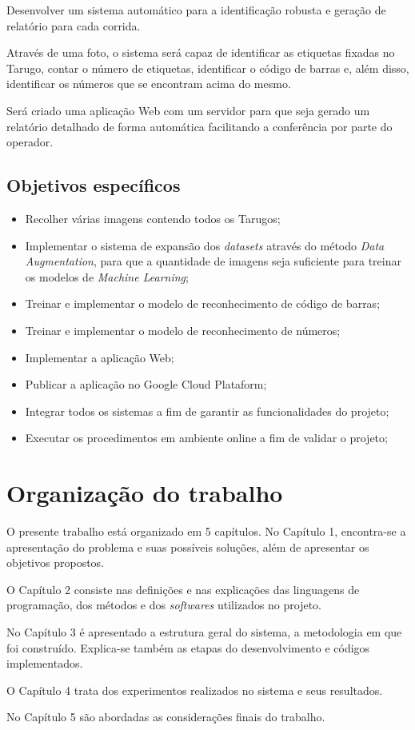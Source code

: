 Desenvolver um sistema automático para a identificação robusta e geração de relatório para cada corrida.

Através de uma foto, o sistema será capaz de identificar as etiquetas fixadas no Tarugo, contar o número de etiquetas, identificar o código de barras e, além disso, identificar os números que se encontram acima do mesmo.

Será criado uma aplicação Web com um servidor para que seja gerado um relatório detalhado de forma automática facilitando a conferência por parte do operador.

\subsection{Objetivos específicos}

\begin{itemize}
	\item Recolher várias imagens contendo todos os Tarugos;
	\item Implementar o sistema de expansão dos \textit{datasets} através do método \textit{Data Augmentation}, para que a quantidade de imagens seja suficiente para treinar os modelos de \textit{Machine Learning};
	\item Treinar e implementar o modelo de reconhecimento de código de barras;
	\item Treinar e implementar o modelo de reconhecimento de números;
	\item Implementar a aplicação Web;
	\item Publicar a aplicação no Google Cloud Plataform;
	\item Integrar todos os sistemas a fim de garantir as funcionalidades do projeto;
	\item Executar os procedimentos em ambiente online a fim de validar o projeto;
\end{itemize}


\section{Organização do trabalho}

O presente trabalho está organizado em 5 capítulos. No Capítulo 1, encontra-se
a apresentação do problema e suas possíveis soluções, além de apresentar os objetivos
propostos.

O Capítulo 2 consiste nas definições e nas explicações das linguagens de programação, dos métodos e dos \textit{softwares} utilizados no projeto.

No Capítulo 3 é apresentado a estrutura geral do sistema, a metodologia em que foi construído. Explica-se também as etapas do desenvolvimento e códigos implementados.

O Capítulo 4 trata dos experimentos realizados no sistema e seus resultados.

No Capítulo 5 são abordadas as considerações finais do trabalho.